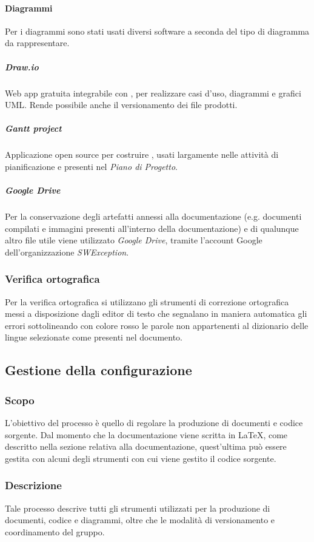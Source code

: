 \paragraph{Diagrammi}
Per i diagrammi sono stati usati diversi software a seconda del tipo di diagramma da rappresentare.
\subparagraph{\textit{Draw.io}}
Web app gratuita integrabile con , per realizzare casi d'uso, diagrammi e grafici UML. Rende possibile anche il versionamento dei file prodotti.
\subparagraph{\textit{Gantt project}}
Applicazione open source per costruire , usati largamente nelle attività di pianificazione e presenti nel \textit{Piano di Progetto}.
\subparagraph{\textit{Google Drive}}
Per la conservazione degli artefatti annessi alla documentazione (e.g. documenti compilati e immagini presenti all'interno della documentazione) e di qualunque altro file utile viene utilizzato \textit{Google Drive}, tramite l'account Google dell'organizzazione \textit{SWException}. 

\subsubsection{Verifica ortografica}
Per la verifica ortografica si utilizzano gli strumenti di correzione ortografica messi a disposizione dagli editor di testo che segnalano in maniera automatica gli errori sottolineando con colore rosso le parole non appartenenti al dizionario delle lingue selezionate come presenti nel documento.

\subsection{Gestione della configurazione} \label{_gestioneDellaConfigurazione}
\subsubsection{Scopo}
L'obiettivo del processo è quello di regolare la produzione di documenti e codice sorgente.
Dal momento che la documentazione viene scritta in \LaTeX, come descritto nella sezione relativa
alla documentazione, quest'ultima può essere gestita con alcuni degli strumenti con
cui viene gestito il codice sorgente.

\subsubsection{Descrizione}
Tale processo descrive tutti gli strumenti utilizzati per la produzione di documenti, codice e diagrammi,
oltre che le modalità di versionamento e coordinamento del gruppo.

